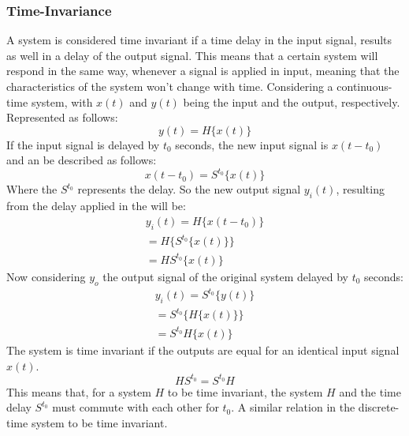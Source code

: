 \subsubsection*{Time-Invariance}
A system is considered time invariant if a time delay in the input signal, results as well in a delay of the output signal. This means that a certain system will respond in the same way, whenever a signal is applied in input, meaning that the characteristics of the system won't change with time. Considering a continuous-time system, with $x(t)$ and $y(t)$ being the input and the output, respectively. Represented as follows:
\begin{equation}
    y(t) = H\{x(t)\}
\end{equation} 
If the input signal is delayed by $t_0$ seconds, the new input signal is $x(t-t_0)$ and an be described as follows:
\begin{equation}
    x(t-t_0) = S^{t_0}\{x(t)\}
\end{equation}
Where the $S^{t_0}$ represents the delay. So the new output signal $y_i(t)$, resulting from the delay applied in the will be:
\begin{equation}
    \begin{aligned}
        y_i(t) = H\{x(t-t_0)\}\\
        = H\{S^{t_0}\{x(t)\}\}\\
        =HS^{t_0}\{x(t)\}    
    \end{aligned}
\end{equation}
Now considering $y_o$ the output signal of the original system delayed by $t_0$ seconds: 
\begin{equation}
    \begin{aligned}
        y_i(t) = S^{t_0}\{y(t)\}\\
        = S^{t_0}\{H\{x(t)\}\}\\
        =S^{t_0}H\{x(t)\}    
    \end{aligned}
\end{equation}
The system is time invariant if the outputs are equal for an identical input signal $x(t)$. 
\begin{equation}
    HS^{t_0} = S^{t_0}H
\end{equation}
This means that, for a system $H$ to be time invariant, the system $H$ and the time delay $S^{t_0}$ must commute with each other for $t_0$. A similar relation in the discrete-time system to be time invariant.  
